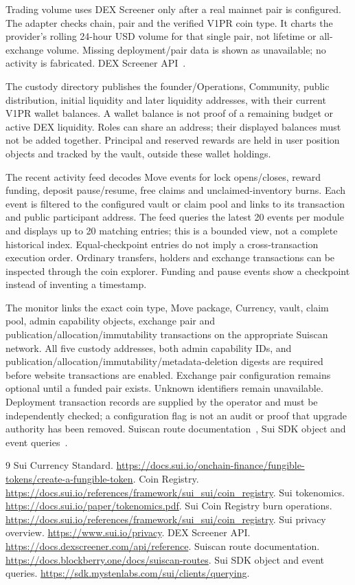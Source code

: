 \documentclass[11pt]{article}
\begin{document}
Trading volume uses DEX Screener only after a real mainnet pair is configured. The adapter checks chain, pair and the verified V1PR coin type. It charts the provider's rolling 24-hour USD volume for that single pair, not lifetime or all-exchange volume. Missing deployment/pair data is shown as unavailable; no activity is fabricated. DEX Screener API~\cite{ref6}.

 The custody directory publishes the founder/Operations, Community, public distribution, initial liquidity and later liquidity addresses, with their current V1PR wallet balances. A wallet balance is not proof of a remaining budget or active DEX liquidity. Roles can share an address; their displayed balances must not be added together. Principal and reserved rewards are held in user position objects and tracked by the vault, outside these wallet holdings.

The recent activity feed decodes Move events for lock opens/closes, reward funding, deposit pause/resume, free claims and unclaimed-inventory burns. Each event is filtered to the configured vault or claim pool and links to its transaction and public participant address. The feed queries the latest 20 events per module and displays up to 20 matching entries; this is a bounded view, not a complete historical index. Equal-checkpoint entries do not imply a cross-transaction execution order. Ordinary transfers, holders and exchange transactions can be inspected through the coin explorer. Funding and pause events show a checkpoint instead of inventing a timestamp.

The monitor links the exact coin type, Move package, Currency, vault, claim pool, admin capability objects, exchange pair and publication/allocation/immutability transactions on the appropriate Suiscan network. All five custody addresses, both admin capability IDs, and publication/allocation/immutability/metadata-deletion digests are required before website transactions are enabled. Exchange pair configuration remains optional until a funded pair exists. Unknown identifiers remain unavailable. Deployment transaction records are supplied by the operator and must be independently checked; a configuration flag is not an audit or proof that upgrade authority has been removed. Suiscan route documentation~\cite{ref7}, Sui SDK object and event queries~\cite{ref8}.

\begin{thebibliography}{9}
\footnotesize
{} Sui Currency Standard. \url{https://docs.sui.io/onchain-finance/fungible-tokens/create-a-fungible-token}.
 Coin Registry. \url{https://docs.sui.io/references/framework/sui_sui/coin_registry}.
 Sui tokenomics. \url{https://docs.sui.io/paper/tokenomics.pdf}.
 Sui Coin Registry burn operations. \url{https://docs.sui.io/references/framework/sui_sui/coin_registry}.
 Sui privacy overview. \url{https://www.sui.io/privacy}.
 DEX Screener API. \url{https://docs.dexscreener.com/api/reference}.
 Suiscan route documentation. \url{https://docs.blockberry.one/docs/suiscan-routes}.
 Sui SDK object and event queries. \url{https://sdk.mystenlabs.com/sui/clients/querying}.
\end{thebibliography}
\end{document}
